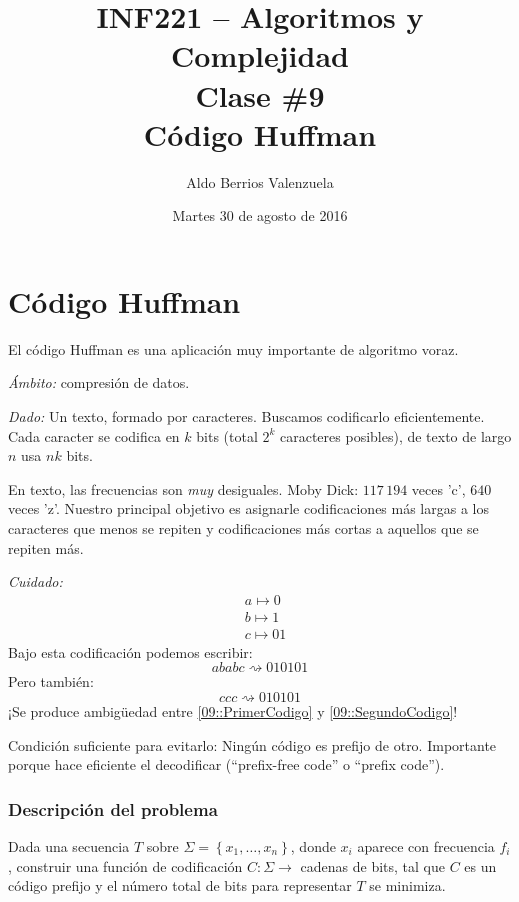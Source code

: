 \documentclass[english, spanish, fleqn, 10pt]{article}
\author{Aldo Berrios Valenzuela}
\title{INF221 -- Algoritmos y Complejidad\\[.4\baselineskip]Clase \#9\\Código Huffman}
\date{Martes 30 de agosto de 2016}
\newcommand{\comillas}[1]{``#1''}
\numberwithin{equation}{section}
\newcommand{\llaves}[1]{\left \{ #1 \right \}}
\theoremstyle{definition}
\begin{document}
\maketitle
\section{Código Huffman}
El código Huffman es una aplicación muy importante de algoritmo voraz.

\noindent\emph{Ámbito:} compresión de datos.

\noindent\emph{Dado:} Un texto, formado por caracteres. Buscamos codificarlo eficientemente. Cada caracter se codifica en $k$ bits (total $2^k$ caracteres posibles), de texto de largo $n$ usa $nk$ bits.

En texto, las frecuencias son \emph{muy} desiguales. Moby Dick: $117\,194$ veces 'c', $640$ veces 'z'. Nuestro principal objetivo es asignarle codificaciones más largas a los caracteres que menos se repiten y codificaciones más cortas a aquellos que se repiten más.

\noindent\emph{Cuidado:}
\begin{align*}
&a\mapsto 0\\
&b\mapsto 1\\
&c\mapsto 01
\end{align*}
Bajo esta codificación podemos escribir:
\begin{equation}\label{09::PrimerCodigo}
ababc\rightsquigarrow 010101
\end{equation}
Pero también:
\begin{equation}\label{09::SegundoCodigo}
ccc\rightsquigarrow 010101
\end{equation}
¡Se produce ambigüedad entre \eqref{09::PrimerCodigo} y \eqref{09::SegundoCodigo}! 

Condición suficiente para evitarlo: Ningún código es prefijo de otro. Importante porque hace eficiente el decodificar (\comillas{prefix-free code} o \comillas{prefix code}).

\subsubsection{Descripción del problema}
Dada una secuencia $T$ sobre $\Sigma=\llaves{x_1, \ldots, x_n}$, donde $x_i$ aparece con frecuencia $f_i$, construir una función de codificación $C:\Sigma\rightarrow$ cadenas de bits, tal que $C$ es un código prefijo y el número total de bits para representar $T$ se minimiza.
\end{document}
